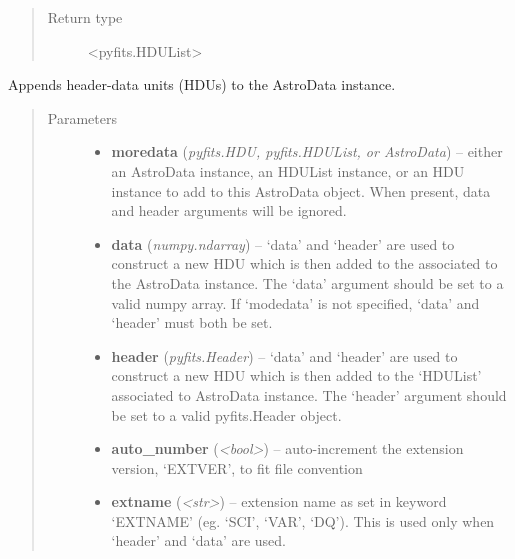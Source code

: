 \documentclass[letterpaper,10pt,english]{sphinxmanual}
\begin{document}
\begin{fulllineitems}
\begin{fulllineitems}
\begin{quote}
\begin{description}
\item[{Return type}] \leavevmode
\textless{}pyfits.HDUList\textgreater{}

\end{description}\end{quote}

\end{fulllineitems}


\begin{fulllineitems}
\label{astro_class:astrodata.AstroData.AstroData.append}
Appends header-data units (HDUs) to the AstroData instance.
\begin{quote}\begin{description}
\item[{Parameters}] \leavevmode\begin{itemize}
\item {} 
\textbf{moredata} (\emph{pyfits.HDU, pyfits.HDUList, or AstroData}) -- either an AstroData instance, an HDUList instance, 
or an HDU instance to add to this AstroData object.
When present, data and header arguments will be 
ignored.

\item {} 
\textbf{data} (\emph{numpy.ndarray}) -- `data' and `header' are used to construct a new HDU which
is then added to the  associated to the 
AstroData instance. The `data' argument should be set to 
a valid numpy array. If `modedata' is not specified, 
`data' and `header' must both be set.

\item {} 
\textbf{header} (\emph{pyfits.Header}) -- `data' and `header' are used to construct a new 
HDU which is then added to the `HDUList' associated to 
AstroData instance. The `header' argument should be set 
to a valid pyfits.Header object.

\item {} 
\textbf{auto\_number} (\emph{\textless{}bool\textgreater{}}) -- auto-increment the extension version, `EXTVER', 
to fit file convention

\item {} 
\textbf{extname} (\emph{\textless{}str\textgreater{}}) -- extension name as set in keyword `EXTNAME' 
(eg. `SCI', `VAR', `DQ'). This is used only when 
`header' and `data' are used.


\end{itemize}
\end{description}
\end{quote}
\end{fulllineitems}
\end{fulllineitems}
\end{document}
